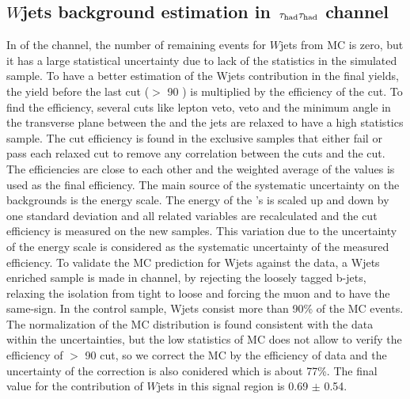 \subsection{\texorpdfstring{$W$jets background estimation in $\,\tau_{\rm had}\tau_{\rm had}$ channel}{Wjets background estimation in tau-tau channel}}
In \binone of the \tauTau channel, the number of remaining events for $W$jets from MC is zero, but it has a large statistical uncertainty due to 
lack of the statistics in the simulated sample. 
To have a better estimation of the Wjets contribution in the final yields,
the yield before the last cut (\mttwo $>$ 90 \GeV) is multiplied by the efficiency of the cut. To find the efficiency, several cuts like 
lepton veto, \Z veto and the minimum angle in the transverse plane between the \MET and the jets 
are relaxed to have a high statistics sample. The cut efficiency is found in the exclusive samples that either fail or pass each relaxed cut
to remove any correlation between the cuts and the \mttwo cut.
The efficiencies are close to each other and the weighted average of the values is used as the final efficiency.
The main source of the systematic uncertainty on the backgrounds 
is the \Tau energy scale. The energy of the \Tau's is scaled up and down by one standard deviation and all related variables are 
recalculated and the cut efficiency is measured on the new samples. 
This variation due to the uncertainty of the \Tau energy scale is considered as the systematic uncertainty of the measured efficiency.
To validate the MC prediction for Wjets against the data, a Wjets enriched sample is made in \muTau channel, 
by rejecting the loosely tagged b-jets, relaxing the \Tau isolation from tight to loose and forcing the muon and \Tau to have the same-sign. 
In the control sample, Wjets consist more than 90\% of the MC events. The normalization of the MC distribution  is found consistent
with the data within the uncertainties, but the low statistics of MC does not allow to verify the efficiency of \mttwo $>$ 90 \GeV cut, 
so we correct the MC by the efficiency of data and the uncertainty of the correction is also conidered which is about 77\%. 
The final value for the contribution of $W$jets in this signal region is 0.69 $\pm$ 0.54.

